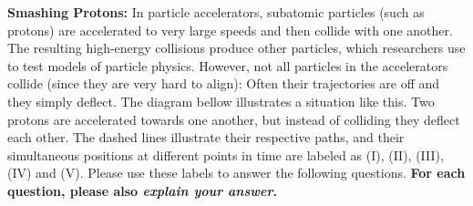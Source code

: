 \documentclass[addpoints,12pt]{exam}
\begin{document}
\begin{questions}
\begin{minipage}{\linewidth}
\end{minipage}

\clearpage

\question \textbf{Smashing Protons:} In particle accelerators, subatomic particles (such as protons) are accelerated to very large speeds and then collide with one another. The resulting high-energy collisions produce other particles, which researchers use to test models of particle physics. However, not all particles in the accelerators collide (since they are very hard to align): Often their trajectories are off and they simply deflect. The diagram bellow illustrates a situation like this. Two protons are accelerated towards one another, but instead of colliding they deflect each other. The dashed lines illustrate their respective paths, and their simultaneous positions at different points in time are labeled as (I), (II), (III), (IV) and (V). Please use these labels to answer the following questions. \textbf{For each question, please also \textit{explain your answer}.}
	

\end{questions}
\end{document}
